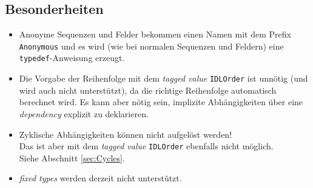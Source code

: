 \documentclass [a4paper,10pt] {scrartcl}
\begin{document}
\subsection{Besonderheiten}
\begin{itemize}
\item Anonyme Sequenzen und Felder bekommen einen Namen mit dem Prefix \texttt{Anonymous}
    und es wird (wie bei normalen Sequenzen und Feldern) eine \texttt{typedef}-Anweisung erzeugt.
\item Die Vorgabe der Reihenfolge mit dem \emph{tagged value} \texttt{IDLOrder} ist
    unn{\"o}tig (und wird auch nicht unterst{\"u}tzt), da die richtige Reihenfolge
    automatisch berechnet wird. Es kann aber n{\"o}tig sein, implizite Abh{\"a}ngigkeiten
    {\"u}ber eine \emph{dependency} explizit zu deklarieren.
\item Zyklische Abh{\"a}ngigkeiten k{\"o}nnen nicht aufgel{\"o}st werden!\\
    Das ist aber mit dem \emph{tagged value} \texttt{IDLOrder} ebenfalls nicht m{\"o}glich.\\
    Siehe Abschnitt \ref{sec:Cycles}.
\item \emph{fixed types} werden derzeit nicht unterst{\"u}tzt.
\end{itemize}

\newpage
\end{document}
